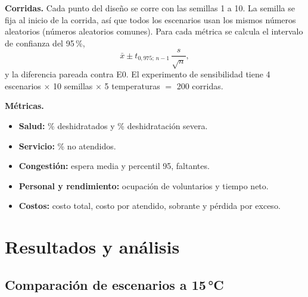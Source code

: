 \documentclass[11pt,a4paper]{article}
\begin{document}
\textbf{Corridas.} Cada punto del diseño se corre con las semillas 1 a 10. La semilla se fija al inicio de la corrida, así que todos los escenarios usan los mismos números aleatorios (números aleatorios comunes). Para cada métrica se calcula el intervalo de confianza del 95\,\%,
\begin{equation}
    \bar{x} \pm t_{0{,}975;\,n-1} \, \frac{s}{\sqrt{n}},
\end{equation}
y la diferencia pareada contra E0. El experimento de sensibilidad tiene 4 escenarios $\times$ 10 semillas $\times$ 5 temperaturas $=$ 200 corridas.

\textbf{Métricas.}
\begin{itemize}
    \item \textbf{Salud:} \% deshidratados y \% deshidratación severa.
    \item \textbf{Servicio:} \% no atendidos.
    \item \textbf{Congestión:} espera media y percentil 95, faltantes.
    \item \textbf{Personal y rendimiento:} ocupación de voluntarios y tiempo neto.
    \item \textbf{Costos:} costo total, costo por atendido, sobrante y pérdida por exceso.
\end{itemize}

\section{Resultados y análisis}

\subsection{Comparación de escenarios a 15\,°C}
\end{document}
